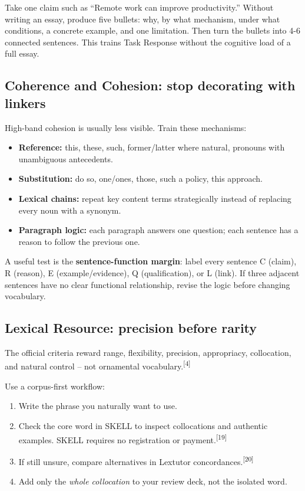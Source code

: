 \documentclass[11pt,a4paper]{article}
\newcommand{\src}[1]{\textsuperscript{[#1]}}
\begin{document}
\begin{practicebox}
Take one claim such as ``Remote work can improve productivity.'' Without writing an essay, produce five bullets: why, by what mechanism, under what conditions, a concrete example, and one limitation. Then turn the bullets into 4-6 connected sentences. This trains Task Response without the cognitive load of a full essay.
\end{practicebox}

\subsection{Coherence and Cohesion: stop decorating with linkers}
High-band cohesion is usually less visible. Train these mechanisms:
\begin{itemize}
\item \textbf{Reference:} this, these, such, former/latter where natural, pronouns with unambiguous antecedents.
\item \textbf{Substitution:} do so, one/ones, those, such a policy, this approach.
\item \textbf{Lexical chains:} repeat key content terms strategically instead of replacing every noun with a synonym.
\item \textbf{Paragraph logic:} each paragraph answers one question; each sentence has a reason to follow the previous one.
\end{itemize}

A useful test is the \textbf{sentence-function margin}: label every sentence C (claim), R (reason), E (example/evidence), Q (qualification), or L (link). If three adjacent sentences have no clear functional relationship, revise the logic before changing vocabulary.

\subsection{Lexical Resource: precision before rarity}
The official criteria reward range, flexibility, precision, appropriacy, collocation, and natural control -- not ornamental vocabulary.\src{4}

Use a corpus-first workflow:
\begin{enumerate}
\item Write the phrase you naturally want to use.
\item Check the core word in SKELL to inspect collocations and authentic examples. SKELL requires no registration or payment.\src{19}
\item If still unsure, compare alternatives in Lextutor concordances.\src{20}
\item Add only the \emph{whole collocation} to your review deck, not the isolated word.
\end{enumerate}
\end{document}
